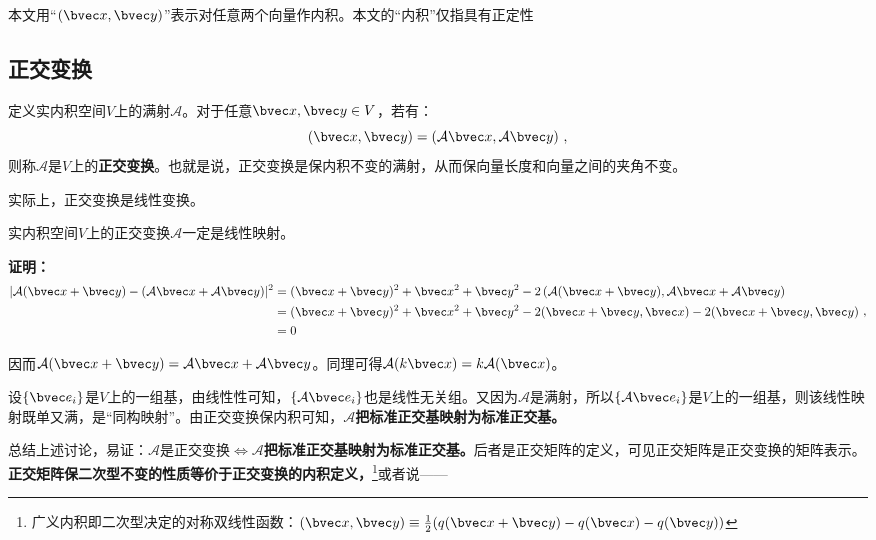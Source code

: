 
本文用“$(\bvec x,\bvec y)$”表示对任意两个向量作内积。本文的“内积”仅指具有正定性
\subsection{正交变换}
\begin{definition}{}\label{def_ortho_1}
定义实内积空间$V$上的满射$\mathcal A$。对于任意$\bvec x,\bvec y\in V$，若有：
\begin{equation}
(\bvec x,\bvec y)=(\mathcal A \bvec x,\mathcal A \bvec y)~,
\end{equation}
则称$\mathcal A$是$V$上的\textbf{正交变换}。也就是说，正交变换是保内积不变的满射，从而保向量长度和向量之间的夹角不变。
\end{definition}
实际上，正交变换是线性变换。
\begin{theorem}{}\label{the_ortho_1}
实内积空间$V$上的正交变换$\mathcal A$一定是线性映射。
\end{theorem}
\textbf{证明：}
\begin{equation}
\begin{aligned}
|\mathcal A(\bvec x+\bvec y)-(\mathcal A\bvec x+\mathcal A\bvec y)|^2&=(\bvec x+\bvec y)^2+\bvec x^2+\bvec y^2-2\left(\mathcal A(\bvec x+\bvec y),\mathcal A\bvec x+\mathcal A\bvec y\right)\\
&=(\bvec x+\bvec y)^2+\bvec x^2+\bvec y^2-2(\bvec x+\bvec y,\bvec x)-2(\bvec x+\bvec y,\bvec y)\\
&=0
\end{aligned}
~,\end{equation}

因而$\mathcal A(\bvec x+\bvec y)=\mathcal A\bvec x+\mathcal A\bvec y$。同理可得$\mathcal A(k\bvec x)=k\mathcal A(\bvec x)$。

设$\{\bvec e_i\}$是$V$上的一组基，由线性性可知，$\{\mathcal A\bvec e_i\}$也是线性无关组。又因为$\mathcal A$是满射，所以$\{\mathcal A\bvec e_i\}$是$V$上的一组基，则该线性映射既单又满，是“同构映射”。由正交变换保内积可知，$\mathcal A$\textbf{把标准正交基映射为标准正交基。}

总结上述讨论，易证：$\mathcal A$是正交变换$\Longleftrightarrow \mathcal A$\textbf{把标准正交基映射为标准正交基。}后者是正交矩阵的定义，可见正交矩阵是正交变换的矩阵表示。\textbf{正交矩阵保二次型不变的性质等价于正交变换的内积定义，}\footnote{广义内积即二次型决定的对称双线性函数：$(\bvec x,\bvec y)\equiv \frac{1}{2}(q(\bvec x+\bvec y)-q(\bvec x)-q(\bvec y))$}或者说——

